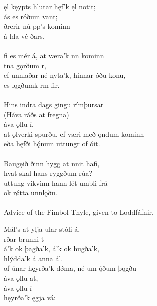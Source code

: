 \bva {}ęl kęypts hlutar \hld hęf'k ęl notit; \\%
\ind {}ás es róðum vant; \\%
ðrerir \hld nú pp's kominn \\%
\ind á lda vé ðars.\\%

 \\

\bva {}fi es mér á, \hld at væra'k nn kominn \\%
\ind {}tna gǫrðum r, \\%
ef unnlaðar né nyta'k, \hld hinnar óðu konu, \\%
\ind es lǫgðumk rm fir.\\%

 \\

\bva Hins indra dags \hld gingu rímþursar \\%
\ind (Háva ráðs at fregna) \\%
\ind {}áva ǫllu í, \\%
at ǫlverki spurðu, \hld ef væri með ǫndum kominn \\%
\ind eða hęfði hǫ́num uttungr of óit.\\%

 \\

\bva Baugęið ðinn \hld hygg at nnit hafi, \\%
\ind hvat skal hans ryggðum rúa? \\%
uttung vikvinn \hld hann lét umbli frá \\%
\ind ok rǿtta unnlǫðu.\\%

 \\

	Advice of the Fimbol-Thyle, given to Loddfáfnir.

\bva Mál's at ylja \hld {}ular stóli á, \\%
\ind {}rðar brunni t \\%
á'k ok þagða'k, \hld {}á'k ok hugða'k, \\%
\ind hlýdda'k á anna ál. \\%
of únar hęyrða'k dǿma, \hld né um ǫ́ðum þǫgðu \\%
\ind {}áva ǫllu at, \\%
\ind {}áva ǫllu í \\%
\ind hęyrða'k ęgja vá:\\%


